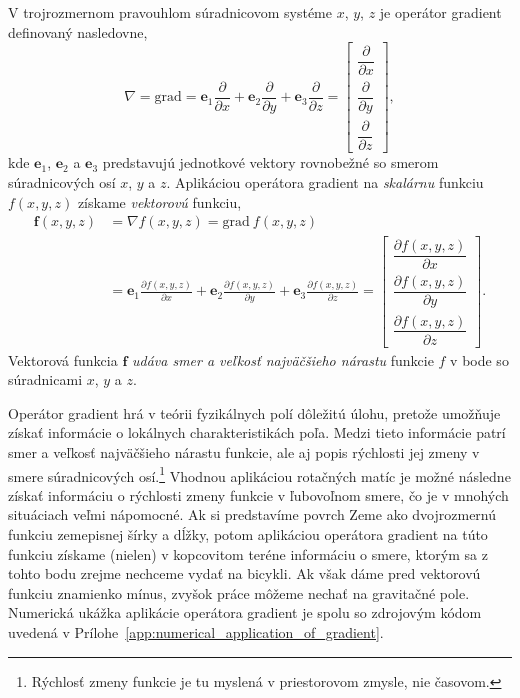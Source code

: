 \documentclass[a4paper, 12pt]{book}
\newcommand{\grad}{\mathrm{grad}}
\let\vec\mathbf
\begin{document}
V trojrozmernom pravouhlom súradnicovom systéme $x$, $y$, $z$ je operátor 
gradient definovaný nasledovne,
%
\begin{equation}
\label{eq:gradient}
\nabla = \grad = \vec e_1 \frac{\partial}{\partial x} + \vec e_2 
\frac{\partial}{\partial y} + \vec e_3 \frac{\partial}{\partial z} =
\begin{bmatrix}
\dfrac{\partial}{\partial x} \\[2ex]
\dfrac{\partial}{\partial y} \\[2ex]
\dfrac{\partial}{\partial z}
\end{bmatrix}
{,}
\end{equation}
%
kde $\vec e_1$, $\vec e_2$ a $\vec e_3$ predstavujú jednotkové vektory 
rovnobežné so smerom súradnicových osí $x$, $y$ a $z$.  Aplikáciou operátora 
gradient na \emph{skalárnu} funkciu $f(x, y, z)$ získame \emph{vektorovú} 
funkciu,
%
\begin{equation}
\begin{split}
\vec f(x, y, z) &= \nabla f(x, y, z) = \grad \ f(x, y, z)\\
%
&= \vec e_1 \frac{\partial f(x, y, z)}{\partial x} + \vec e_2 \frac{\partial 
f(x, y, z)}{\partial y} + \vec e_3 \frac{\partial f(x, y, z)}{\partial z} =
\begin{bmatrix}
\dfrac{\partial f(x, y, z)}{\partial x} \\[2ex]
\dfrac{\partial f(x, y, z)}{\partial y} \\[2ex]
\dfrac{\partial f(x, y, z)}{\partial z}
\end{bmatrix}
{.}
\end{split}
\end{equation}
%
Vektorová funkcia $\vec f$ \emph{udáva smer a veľkosť najväčšieho nárastu} 
funkcie $f$ v bode so súradnicami $x$, $y$ a $z$.

Operátor gradient hrá v teórii fyzikálnych polí dôležitú úlohu, pretože 
umožňuje získať informácie o lokálnych charakteristikách poľa.  Medzi tieto 
informácie patrí smer a veľkosť najväčšieho nárastu funkcie, ale aj popis 
rýchlosti jej zmeny v smere súradnicových osí.\footnote{Rýchlosť zmeny funkcie 
je tu myslená v priestorovom zmysle, nie časovom.}  Vhodnou aplikáciou 
rotačných matíc je možné následne získať informáciu o rýchlosti zmeny funkcie 
v ľubovoľnom smere, čo je v mnohých situáciach veľmi nápomocné.  Ak si 
predstavíme povrch Zeme ako dvojrozmernú funkciu zemepisnej šírky a dĺžky, 
potom aplikáciou operátora gradient na túto funkciu získame (nielen) 
v kopcovitom teréne informáciu o smere, ktorým sa z tohto bodu zrejme nechceme 
vydať na bicykli.  Ak však dáme pred vektorovú funkciu znamienko mínus, zvyšok 
práce môžeme nechať na gravitačné pole.  Numerická ukážka aplikácie operátora 
gradient je spolu so zdrojovým kódom uvedená 
v Prílohe~\ref{app:numerical_application_of_gradient}.
\end{document}
